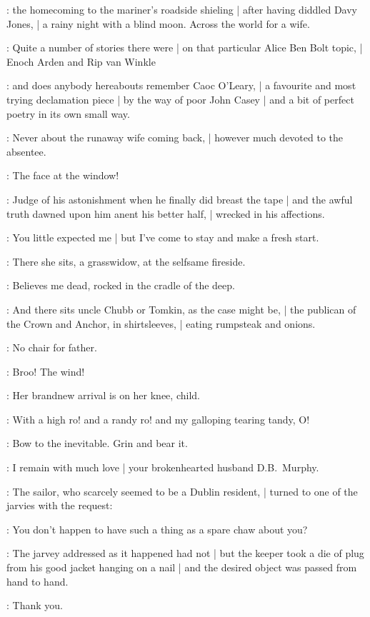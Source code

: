 :
the homecoming to the mariner's roadside shieling |
after having diddled Davy Jones, |
a rainy night with a blind moon.
Across the world for a wife.

:
Quite a number of stories there were |
on that particular Alice Ben Bolt topic, |
Enoch Arden and Rip van Winkle

:
and does anybody hereabouts remember Caoc O'Leary, |
a favourite and most trying declamation piece |
by the way of poor John Casey |
and a bit of perfect poetry in its own small way.

:
Never about the runaway wife coming back, |
however much devoted to the absentee.

:
The face at the window!

:
Judge of his astonishment when he finally did breast the tape |
and the awful truth dawned upon him anent his better half, |
wrecked in his affections.

:
You little expected me |
but I've come to stay and make a fresh start.

:
There she sits, a grasswidow, at the selfsame fireside.

:
Believes me dead, rocked in the cradle of the deep.

:
And there sits uncle Chubb or Tomkin, as the case might be, |
the publican of the Crown and Anchor, in shirtsleeves, |
eating rumpsteak and onions.

:
No chair for father.

:
Broo! The wind!

:
Her brandnew arrival is on her knee,  child.

:
With a high ro! and a randy ro! and my galloping tearing tandy, O!

:
Bow to the inevitable.
Grin and bear it.

:
I remain with much love |
your brokenhearted husband D.B.~Murphy.

:
The sailor, who scarcely seemed to be a Dublin resident, |
turned to one of the jarvies with the request:

\Murphy:
You don't happen to have such a thing as a spare chaw about you?

:
The jarvey addressed as it happened had not |
but the keeper took a die of plug from his good jacket hanging on a nail |
and the desired object was passed from hand to hand.

\Murphy:
Thank you.

